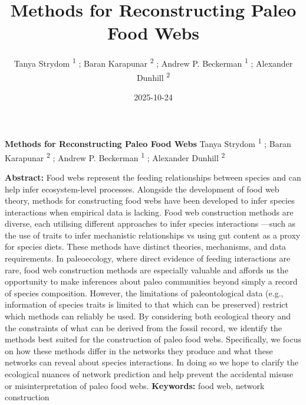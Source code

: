 \documentclass[
]{article}
\title{Methods for Reconstructing Paleo Food Webs}
\author{Tanya Strydom %
%
\textsuperscript{%
%
1%
}%
; Baran Karapunar %
%
\textsuperscript{%
%
2%
}%
; Andrew P. Beckerman %
%
\textsuperscript{%
%
1%
}%
; Alexander Dunhill %
%
\textsuperscript{%
%
2%
}%
}
\date{2025-10-24}
\begin{document}
\thispagestyle{empty}
{\bfseries\sffamily\Large Methods for Reconstructing Paleo Food Webs}
\vfil
Tanya Strydom %
%
\textsuperscript{%
%
1%
}%
; Baran Karapunar %
%
\textsuperscript{%
%
2%
}%
; Andrew P. Beckerman %
%
\textsuperscript{%
%
1%
}%
; Alexander Dunhill %
%
\textsuperscript{%
%
2%
}%

\vfil
{\small
\textbf{Abstract:} Food webs represent the feeding relationships between
species and can help infer ecosystem-level processes. Alongside the
development of food web theory, methods for constructing food webs have
been developed to infer species interactions when empirical data is
lacking. Food web construction methods are diverse, each utilising
different approaches to infer species interactions ---such as the use of
traits to infer mechanistic relationships vs using gut content as a
proxy for species diets. These methods have distinct theories,
mechanisms, and data requirements. In paleoecology, where direct
evidence of feeding interactions are rare, food web construction methods
are especially valuable and affords us the opportunity to make
inferences about paleo communities beyond simply a record of species
composition. However, the limitations of paleontological data (e.g.,
information of species traits is limited to that which can be preserved)
restrict which methods can reliably be used. By considering both
ecological theory and the constraints of what can be derived from the
fossil record, we identify the methods best suited for the construction
of paleo food webs. Specifically, we focus on how these methods differ
in the networks they produce and what these networks can reveal about
species interactions. In doing so we hope to clarify the ecological
nuances of network prediction and help prevent the accidental misuse or
misinterpretation of paleo food webs.
\vfil
\textbf{Keywords:} %
food web, %
network construction%
}
\clearpage
\setcounter{page}{1}
\doublespacing
\linenumbers
\end{document}
